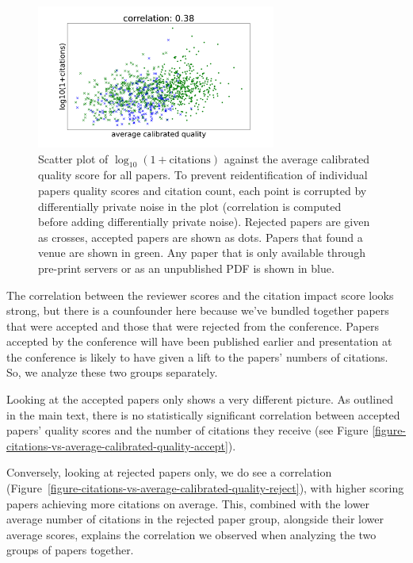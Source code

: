 \begin{figure}[htb]
\centering
\includegraphics[width=0.70\textwidth]{diagrams/neurips/citations-vs-average-calibrated-quality-all.pdf}


\caption{Scatter plot of $\log_{10}(1+\text{citations})$ against the average calibrated quality score for all papers. To prevent reidentification of individual papers quality scores and citation count, each point is corrupted by differentially private noise in the plot (correlation is computed before adding differentially private noise). Rejected papers are given as crosses, accepted papers are shown as dots. Papers that found a venue are shown in green. Any paper that is only available through pre-print servers or as an unpublished PDF is shown in blue.}
\label{figure-citations-vs-average-calibrated-quality-all}
\end{figure}

The correlation between the reviewer scores and the citation impact score looks strong, but there is a counfounder here because we've bundled together papers that were accepted and those that were rejected from the conference. Papers accepted by the conference will have been published earlier and presentation at the conference is likely to have given a  lift to the papers' numbers of citations. So, we analyze these two groups separately.

Looking at the accepted papers only shows a very different picture. As outlined in the main text, 
there is no statistically significant correlation between accepted papers' quality scores
and the number of citations they receive (see Figure \ref{figure-citations-vs-average-calibrated-quality-accept}). 

Conversely, looking at rejected papers only, we do see a correlation (Figure~\ref{figure-citations-vs-average-calibrated-quality-reject}),
with higher scoring papers achieving more citations on average. This,
combined with the lower average number of citations in the rejected
paper group, alongside their lower average scores, explains the
correlation we observed when analyzing the two groups of papers together.

